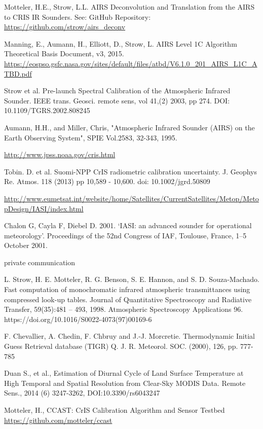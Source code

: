 \documentclass[twocolumn,10pt]{article}
\begin{document}
\begin{thebibliography}{9}
  Motteler, H.E., Strow, L.L.
  AIRS Deconvolution and Translation from the AIRS to CRIS IR Sounders. See:
  GitHub Repository:
  \url{https://github.com/strow/airs_deconv}

  Manning, E., Aumann, H., Elliott, D., Strow, L.
  AIRS Level 1C Algorithm Theoretical Basis Document, v3, 2015.
\url{https://eospso.gsfc.nasa.gov/sites/default/files/atbd/V6.1.0_201_AIRS_L1C_ATBD.pdf}
  
  Strow et al. 
  Pre-launch Spectral Calibration of the Atmospheric Infrared Sounder.
  IEEE trans. Geosci. remote sens,
  vol 41,(2) 2003, pp 274.
  DOI: 10.1109/TGRS.2002.808245

  Aumann, H.H., and Miller, Chris, 
  "Atmospheric Infrared Sounder (AIRS) on the Earth Observing System", 
  SPIE Vol.2583, 32-343, 1995.

 \url{http://www.jpss.noaa.gov/cris.html}

  Tobin. D. et al.
  Suomi-NPP CrIS radiometric calibration uncertainty.
  J. Geophys Re. Atmos. 118 (2013) pp 10,589 - 10,600.
  doi: 10.1002/jgrd.50809

  \url{http://www.eumetsat.int/website/home/Satellites/CurrentSatellites/Metop/MetopDesign/IASI/index.html}

  Chalon G, Cayla F, Diebel D. 2001. 
  ‘IASI: an advanced sounder for operational meteorology’. 
  Proceedings of the 52nd Congress of IAF, Toulouse, France, 1–5 October 2001.

  private communication

  L. Strow, H. E. Motteler, R. G. Benson, S. E. Hannon, and S. D. Souza-Machado. 
  Fast computation of monochromatic infrared atmospheric transmittances using compressed look-up tables. 
  Journal of Quantitative Spectroscopy and Radiative Transfer, 59(35):481 – 493, 1998. 
  Atmospheric Spectroscopy Applications 96.
  https://doi.org/10.1016/S0022-4073(97)00169-6

  F. Chevallier, A. Chedin, F. Chbruy and J.-J. Morcretie.
  Thermodynamic Initial Guess Retrieval database  (TIGR) 
  Q. J. R. Meteorol. SOC. (2000), 126, pp.  777-785

  Duan S., et al.,
  Estimation of Diurnal Cycle of Land Surface Temperature at High Temporal and Spatial Resolution from Clear-Sky MODIS Data.
  Remote Sens., 2014 (6) 3247-3262,
  DOI:10.3390/rs6043247

  Motteler, H.,
  CCAST: CrIS Calibration Algorithm and Sensor Testbed 
  \url{https://github.com/motteler/ccast}
  
\end{thebibliography}
\end{document}
